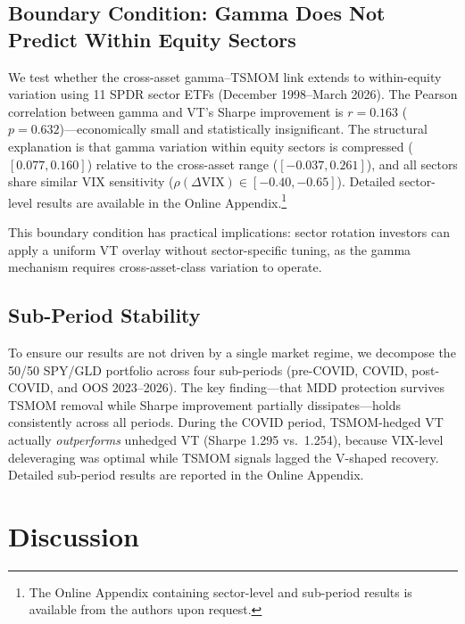 \subsection{Boundary Condition: Gamma Does Not Predict Within Equity Sectors}

We test whether the cross-asset gamma--TSMOM link extends to within-equity variation using 11 SPDR sector ETFs (December 1998--March 2026). The Pearson correlation between gamma and VT's Sharpe improvement is $r = 0.163$ ($p = 0.632$)---economically small and statistically insignificant. The structural explanation is that gamma variation within equity sectors is compressed ($[0.077, 0.160]$) relative to the cross-asset range ($[-0.037, 0.261]$), and all sectors share similar VIX sensitivity ($\rho(\Delta\text{VIX}) \in [-0.40, -0.65]$). Detailed sector-level results are available in the Online Appendix.\footnote{The Online Appendix containing sector-level and sub-period results is available from the authors upon request.}

This boundary condition has practical implications: sector rotation investors can apply a uniform VT overlay without sector-specific tuning, as the gamma mechanism requires cross-asset-class variation to operate.




\subsection{Sub-Period Stability}

To ensure our results are not driven by a single market regime, we decompose the 50/50 SPY/GLD portfolio across four sub-periods (pre-COVID, COVID, post-COVID, and OOS 2023--2026). The key finding---that MDD protection survives TSMOM removal while Sharpe improvement partially dissipates---holds consistently across all periods. During the COVID period, TSMOM-hedged VT actually \textit{outperforms} unhedged VT (Sharpe 1.295 vs.\ 1.254), because VIX-level deleveraging was optimal while TSMOM signals lagged the V-shaped recovery. Detailed sub-period results are reported in the Online Appendix.


\section{Discussion}
\label{sec:discussion}

